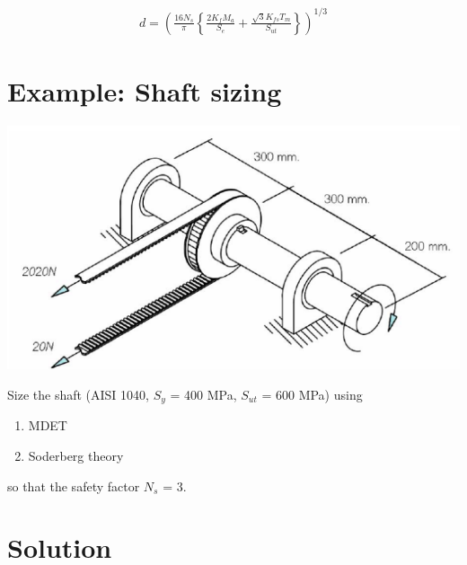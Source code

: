 \documentclass[a4paper,openany]{tufte-book}
\begin{document}
\begin{align}
  d = \left( \frac{16N_s}{\pi} \left\{ \frac{2 K_f M_a}{S_e} + \frac{\sqrt{3} K_{fs} T_m}{S_{ut}} \right\} \right)^{1/3}\end{align}

\section{Example: Shaft sizing}
\label{sec:orgbcfb1c6}

\begin{center}
\includegraphics[width=.9\linewidth]{./pictures/Shafts/shaft-sizing.png}
\end{center}

Size the shaft (AISI 1040, \(S_{y}\) = 400 MPa, \(S_{ut}\) = 600 MPa)
using

\begin{enumerate}
\item MDET

\item Soderberg theory
\end{enumerate}

so that the safety factor \(N_{s}\) = 3.

\section{Solution}
\label{sec:org2ec4291}
\end{document}
